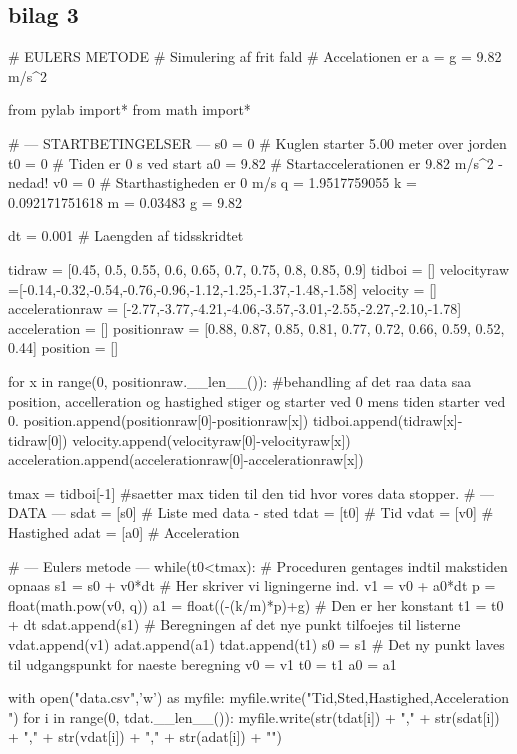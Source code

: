 \documentclass[12pt]{article}
\begin{document}
\subsection*{bilag 3}
\begin{python}
# EULERS METODE
# Simulering af frit fald
# Accelationen er a = g = 9.82 m/s^2

from pylab import*
from math import*

# --- STARTBETINGELSER ---
s0 = 0       # Kuglen starter 5.00 meter over jorden
t0 = 0          # Tiden er 0 s ved start
a0 = 9.82      # Startaccelerationen er 9.82 m/s^2 - nedad!
v0 = 0          # Starthastigheden er 0 m/s
q = 1.9517759055
k = 0.092171751618
m = 0.03483
g = 9.82

dt = 0.001      # Laengden af tidsskridtet

tidraw = [0.45, 0.5, 0.55, 0.6, 0.65, 0.7, 0.75, 0.8, 0.85, 0.9]
tidboi = []
velocityraw =[-0.14,-0.32,-0.54,-0.76,-0.96,-1.12,-1.25,-1.37,-1.48,-1.58]
velocity = []
accelerationraw = [-2.77,-3.77,-4.21,-4.06,-3.57,-3.01,-2.55,-2.27,-2.10,-1.78]
acceleration = []
positionraw = [0.88, 0.87, 0.85, 0.81, 0.77, 0.72, 0.66, 0.59, 0.52, 0.44]
position = []

for x in range(0, positionraw.__len__()):  #behandling af det raa data saa position, accelleration og hastighed stiger og starter ved 0 mens tiden starter ved 0.
    position.append(positionraw[0]-positionraw[x])
    tidboi.append(tidraw[x]-tidraw[0])
    velocity.append(velocityraw[0]-velocityraw[x])
    acceleration.append(accelerationraw[0]-accelerationraw[x])

tmax = tidboi[-1]   #saetter max tiden til den tid hvor vores data stopper.
# --- DATA ---
sdat = [s0]       # Liste med data - sted
tdat = [t0]       # Tid
vdat = [v0]       # Hastighed
adat = [a0]     # Acceleration

# --- Eulers metode ---
while(t0<tmax):     # Proceduren gentages indtil makstiden opnaas
    s1 = s0 + v0*dt # Her skriver vi ligningerne ind.
    v1 = v0 + a0*dt
    p = float(math.pow(v0, q))
    a1 = float((-(k/m)*p)+g)       # Den er her konstant
    t1 = t0 + dt
    sdat.append(s1) # Beregningen af det nye punkt tilfoejes til listerne
    vdat.append(v1)
    adat.append(a1)
    tdat.append(t1)
    s0 = s1         # Det ny punkt laves til udgangspunkt for naeste beregning
    v0 = v1
    t0 = t1
    a0 = a1

with open("data.csv",'w') as myfile:
    myfile.write("Tid,Sted,Hastighed,Acceleration \n")
    for i in range(0, tdat.__len__()):
        myfile.write(str(tdat[i]) + "," + str(sdat[i]) + "," + str(vdat[i]) + "," + str(adat[i]) + "\n")


\end{python}
\end{document}
